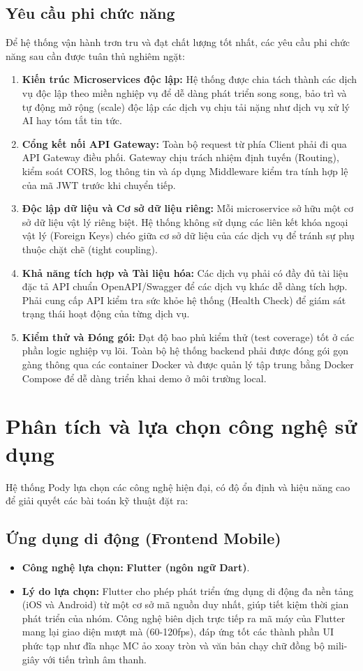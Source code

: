 \documentclass[12pt,a4paper]{report}
\begin{document}
\subsection{Yêu cầu phi chức năng}
Để hệ thống vận hành trơn tru và đạt chất lượng tốt nhất, các yêu cầu phi chức năng sau cần được tuân thủ nghiêm ngặt:
\begin{enumerate}
    \item \textbf{Kiến trúc Microservices độc lập:} Hệ thống được chia tách thành các dịch vụ độc lập theo miền nghiệp vụ để dễ dàng phát triển song song, bảo trì và tự động mở rộng (scale) độc lập các dịch vụ chịu tải nặng như dịch vụ xử lý AI hay tóm tắt tin tức.
    \item \textbf{Cổng kết nối API Gateway:} Toàn bộ request từ phía Client phải đi qua API Gateway điều phối. Gateway chịu trách nhiệm định tuyến (Routing), kiểm soát CORS, log thông tin và áp dụng Middleware kiểm tra tính hợp lệ của mã JWT trước khi chuyển tiếp.
    \item \textbf{Độc lập dữ liệu và Cơ sở dữ liệu riêng:} Mỗi microservice sở hữu một cơ sở dữ liệu vật lý riêng biệt. Hệ thống không sử dụng các liên kết khóa ngoại vật lý (Foreign Keys) chéo giữa cơ sở dữ liệu của các dịch vụ để tránh sự phụ thuộc chặt chẽ (tight coupling).
    \item \textbf{Khả năng tích hợp và Tài liệu hóa:} Các dịch vụ phải có đầy đủ tài liệu đặc tả API chuẩn OpenAPI/Swagger để các dịch vụ khác dễ dàng tích hợp. Phải cung cấp API kiểm tra sức khỏe hệ thống (Health Check) để giám sát trạng thái hoạt động của từng dịch vụ.
    \item \textbf{Kiểm thử và Đóng gói:} Đạt độ bao phủ kiểm thử (test coverage) tốt ở các phần logic nghiệp vụ lõi. Toàn bộ hệ thống backend phải được đóng gói gọn gàng thông qua các container Docker và được quản lý tập trung bằng Docker Compose để dễ dàng triển khai demo ở môi trường local.
\end{enumerate}

\section{Phân tích và lựa chọn công nghệ sử dụng}
Hệ thống Pody lựa chọn các công nghệ hiện đại, có độ ổn định và hiệu năng cao để giải quyết các bài toán kỹ thuật đặt ra:

\subsection{Ứng dụng di động (Frontend Mobile)}
\begin{itemize}
    \item \textbf{Công nghệ lựa chọn:} \textbf{Flutter (ngôn ngữ Dart)}.
    \item \textbf{Lý do lựa chọn:} Flutter cho phép phát triển ứng dụng di động đa nền tảng (iOS và Android) từ một cơ sở mã nguồn duy nhất, giúp tiết kiệm thời gian phát triển của nhóm. Công nghệ biên dịch trực tiếp ra mã máy của Flutter mang lại giao diện mượt mà (60-120fps), đáp ứng tốt các thành phần UI phức tạp như đĩa nhạc MC ảo xoay tròn và văn bản chạy chữ đồng bộ mili-giây với tiến trình âm thanh.
\end{itemize}
\end{document}
